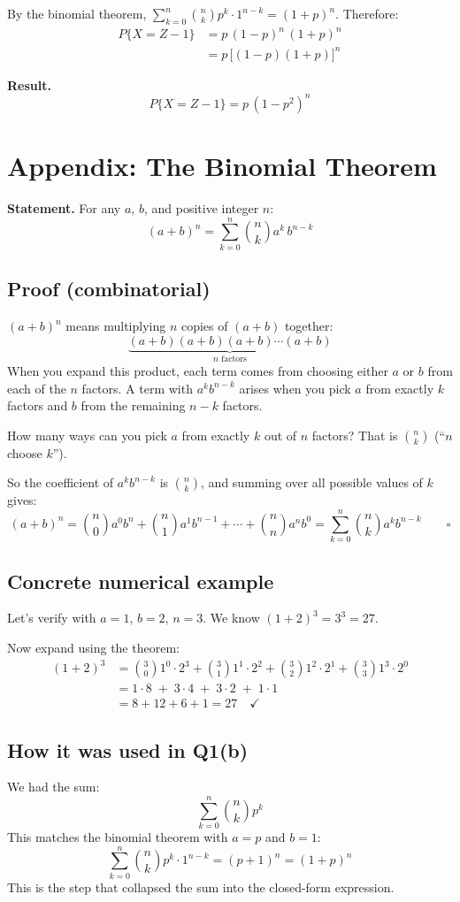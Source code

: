 \documentclass[12pt]{article}
\begin{document}
By the binomial theorem, $\displaystyle\sum_{k=0}^{n} \binom{n}{k} p^k \cdot 1^{n-k} = (1 + p)^n$. Therefore:
\begin{align*}
    P\{X = Z - 1\} &= p\,(1-p)^n\,(1+p)^n \\[6pt]
    &= p\,\bigl[(1-p)(1+p)\bigr]^n
\end{align*}

\textbf{Result.}
\[
    \boxed{P\{X = Z - 1\} = p\,(1 - p^2)^n}
\]

\section*{Appendix: The Binomial Theorem}

\textbf{Statement.} For any $a$, $b$, and positive integer $n$:
\[
    (a + b)^n = \sum_{k=0}^{n} \binom{n}{k} a^k \, b^{n-k}
\]

\subsection*{Proof (combinatorial)}

$(a+b)^n$ means multiplying $n$ copies of $(a+b)$ together:
\[
    \underbrace{(a+b)(a+b)(a+b)\cdots(a+b)}_{n \text{ factors}}
\]
When you expand this product, each term comes from choosing either $a$ or $b$ from each of the $n$ factors. A term with $a^k b^{n-k}$ arises when you pick $a$ from exactly $k$ factors and $b$ from the remaining $n-k$ factors.

How many ways can you pick $a$ from exactly $k$ out of $n$ factors? That is $\binom{n}{k}$ (``$n$ choose $k$'').

So the coefficient of $a^k b^{n-k}$ is $\binom{n}{k}$, and summing over all possible values of $k$ gives:
\[
    (a+b)^n = \binom{n}{0}a^0 b^n + \binom{n}{1}a^1 b^{n-1} + \cdots + \binom{n}{n}a^n b^0 = \sum_{k=0}^{n}\binom{n}{k}a^k b^{n-k} \qquad \square
\]

\subsection*{Concrete numerical example}

Let's verify with $a = 1$, $b = 2$, $n = 3$. We know $(1+2)^3 = 3^3 = 27$.

Now expand using the theorem:
\begin{align*}
    (1+2)^3 &= \binom{3}{0}1^0 \cdot 2^3 + \binom{3}{1}1^1 \cdot 2^2 + \binom{3}{2}1^2 \cdot 2^1 + \binom{3}{3}1^3 \cdot 2^0 \\[6pt]
    &= 1 \cdot 8 \;+\; 3 \cdot 4 \;+\; 3 \cdot 2 \;+\; 1 \cdot 1 \\[6pt]
    &= 8 + 12 + 6 + 1 = 27 \quad \checkmark
\end{align*}

\subsection*{How it was used in Q1(b)}

We had the sum:
\[
    \sum_{k=0}^{n} \binom{n}{k} p^k
\]
This matches the binomial theorem with $a = p$ and $b = 1$:
\[
    \sum_{k=0}^{n} \binom{n}{k} p^k \cdot 1^{n-k} = (p + 1)^n = (1+p)^n
\]
This is the step that collapsed the sum into the closed-form expression.
\end{document}
